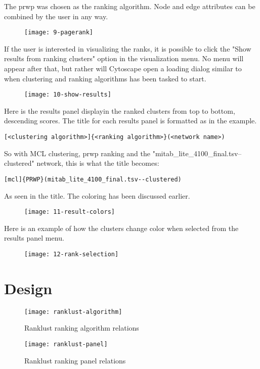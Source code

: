 The \gls{prwp} was chosen as the ranking algorithm. Node and edge attributes can
be combined by the user in any way. 
\begin{figure}[H]
    \texttt{[image: 9-pagerank]}
\end{figure}

If the user is interested in visualizing the ranks, it is possible to click the
"Show results from ranking clusters" option in the visualization menu. No menu
will appear after that, but rather will Cytoscape open a loading dialog similar
to when clustering and ranking algorithms has been tasked to start.
\begin{figure}[H]
    \texttt{[image: 10-show-results]}
\end{figure}

Here is the results panel displayin the ranked clusters from top to bottom,
descending scores. The title for each results panel is formatted as in the
example.
\begin{verbatim}
[<clustering algorithm>]{<ranking algorithm>}(<network name>)
\end{verbatim}
So with MCL clustering, \gls{prwp} ranking and the
"mitab\_lite\_4100\_final.tsv--clustered" network, this is what the title
becomes:
\begin{verbatim}
[mcl]{PRWP}(mitab_lite_4100_final.tsv--clustered)
\end{verbatim}
As seen in the title. The coloring has been discussed earlier.
\begin{figure}[H]
    \texttt{[image: 11-result-colors]}
\end{figure}

Here is an example of how the clusters change color when selected from the
results panel menu.
\begin{figure}[H]
    \texttt{[image: 12-rank-selection]}
\end{figure}

\section{Design}
\begin{figure}[H]
    \caption{Ranklust ranking algorithm relations}
    \label{fig:rank-alg}
    \texttt{[image: ranklust-algorithm]}
\end{figure}
\begin{figure}[H]
    \caption{Ranklust ranking panel relations}
    \label{fig:rank-panel}
    \texttt{[image: ranklust-panel]}
\end{figure}

